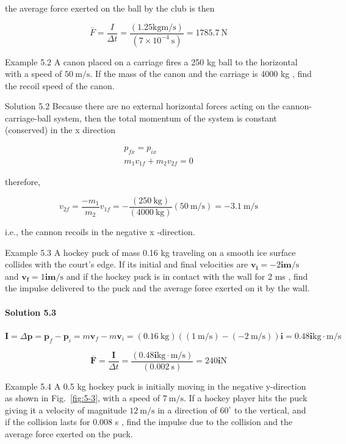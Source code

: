\documentclass[10pt]{article}
\numberwithin{equation}{section}
\begin{document}
the average force exerted on the ball by the club is then

$$
\bar{F}=\frac{I}{\Delta t}=\frac{(1.25 \mathrm{kgm} / \mathrm{s})}{\left(7 \times 10^{-4} \mathrm{~s}\right)}=1785.7 \mathrm{~N}
$$

Example 5.2 A canon placed on a carriage fires a 250 kg ball to the horizontal with a speed of $50 \mathrm{~m} / \mathrm{s}$. If the mass of the canon and the carriage is 4000 kg , find the recoil speed of the canon.

Solution 5.2 Because there are no external horizontal forces acting on the cannon-carriage-ball system, then the total momentum of the system is constant (conserved) in the x direction

$$
\begin{gathered}
p_{f x}=p_{i x} \\
m_{1} v_{1 f}+m_{2} v_{2 f}=0
\end{gathered}
$$

therefore,

$$
v_{2 f}=\frac{-m_{1}}{m_{2}} v_{1 f}=-\frac{(250 \mathrm{~kg})}{(4000 \mathrm{~kg})}(50 \mathrm{~m} / \mathrm{s})=-3.1 \mathrm{~m} / \mathrm{s}
$$

i.e., the cannon recoils in the negative x -direction.

Example 5.3 A hockey puck of mass 0.16 kg traveling on a smooth ice surface collides with the court's edge. If its initial and final velocities are $\mathbf{v}_{\mathbf{i}}=-2 \mathbf{i m} / \mathrm{s}$ and $\mathbf{v}_{\mathbf{f}}=1 \mathbf{i m} / \mathrm{s}$ and if the hockey puck is in contact with the wall for 2 ms , find the impulse delivered to the puck and the average force exerted on it by the wall.

\paragraph*{Solution 5.3}
$\mathbf{I}=\Delta \mathbf{p}=\mathbf{p}_{f}-\mathbf{p}_{i}=m \mathbf{v}_{f}-m \mathbf{v}_{i}=(0.16 \mathrm{~kg})((1 \mathrm{~m} / \mathrm{s})-(-2 \mathrm{~m} / \mathrm{s})) \mathbf{i}=0.48 \mathbf{i} \mathrm{kg} \cdot \mathrm{m} / \mathrm{s}$

$$
\overline{\mathbf{F}}=\frac{\mathbf{I}}{\Delta t}=\frac{(0.48 \mathbf{i} \mathrm{kg} \cdot \mathrm{m} / \mathrm{s})}{(0.002 \mathrm{~s})}=240 \mathbf{i} \mathrm{N}
$$

Example 5.4 A 0.5 kg hockey puck is initially moving in the negative y-direction as shown in Fig.~\ref{fig:5-3}, with a speed of $7 \mathrm{~m} / \mathrm{s}$. If a hockey player hits the puck giving it a velocity of magnitude $12 \mathrm{~m} / \mathrm{s}$ in a direction of $60^{\circ}$ to the vertical, and if the collision lasts for 0.008 s , find the impulse due to the collision and the average force exerted on the puck.
\end{document}
